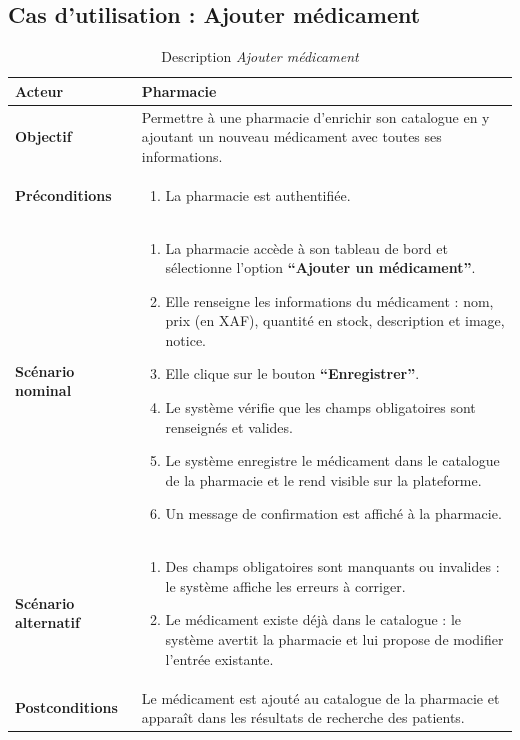 \documentclass[12pt,a4paper]{report}
\begin{document}
\subsection*{Cas d'utilisation : Ajouter médicament}

\begin{table}[H]
    \centering
    \begin{tabular}{|p{4cm}|p{9cm}|}
        \hline
        \textbf{Acteur} & Pharmacie \\
        \hline
        \textbf{Objectif} & Permettre à une pharmacie d'enrichir son catalogue en y ajoutant un nouveau médicament avec toutes ses informations. \\
        \hline
        \textbf{Préconditions} &
        \begin{enumerate}
            \item La pharmacie est authentifiée.
        \end{enumerate} \\
        \hline
        \textbf{Scénario nominal} &
        \begin{enumerate}
            \item La pharmacie accède à son tableau de bord et sélectionne l'option \textbf{``Ajouter un médicament''}.
            \item Elle renseigne les informations du médicament : nom, prix (en XAF), quantité en stock, description et image, notice.
            \item Elle clique sur le bouton \textbf{``Enregistrer''}.
            \item Le système vérifie que les champs obligatoires sont renseignés et valides.
            \item Le système enregistre le médicament dans le catalogue de la pharmacie et le rend visible sur la plateforme.
            \item Un message de confirmation est affiché à la pharmacie.
        \end{enumerate} \\
        \hline
        \textbf{Scénario alternatif} &
        \begin{enumerate}
            \item[4.a] Des champs obligatoires sont manquants ou invalides : le système affiche les erreurs à corriger.
            \item[4.b] Le médicament existe déjà dans le catalogue : le système avertit la pharmacie et lui propose de modifier l'entrée existante.
        \end{enumerate} \\
        \hline
        \textbf{Postconditions} & Le médicament est ajouté au catalogue de la pharmacie et apparaît dans les résultats de recherche des patients. \\
        \hline
    \end{tabular}
    \caption{Description \textit{Ajouter médicament}}
\end{table}
\end{document}
